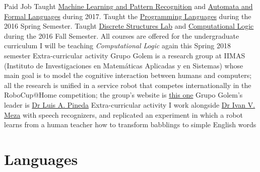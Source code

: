 \documentclass[8pt,a4paper,sans]{moderncv} %
\begin{document}
        {Paid Job}
        {Taught \href{http://turing.iimas.unam.mx/~ivanvladimir/page/curso_rpyaa}{Machine Learning and Pattern Recognition} and \href{https://sites.google.com/site/automataslengformales20172/}{Automata and Formal Languages} during 2017. Taught the \href{https://sites.google.com/site/lengprog20162/}{Programming Languages} during the 2016 Spring Semester. Taught \href{https://sites.google.com/a/ciencias.unam.mx/estructuras-discretas/home}{Discrete Structures Lab} and \href{https://sites.google.com/site/logcompunam20171/home}{Computational Logic} during the 2016 Fall Semester. All courses are offered for the undergraduate curriculum}
        {I will be teaching \emph{Computational Logic} again this Spring 2018 semester}{}{}
        {Extra-curricular activity}
        {Grupo Golem is a research group at IIMAS (Instituto de Investigaciones en Matem\'{a}ticas Aplicadas y en Sistemas) whose main goal is to model the cognitive interaction between humans and computers; all the research is unified in a service robot that competes internationally in the RoboCup@Home competition; the group's website is \href{http://golem.iimas.unam.mx/home.php?lang=en&sec=home}{this one}}
        {Grupo Golem's leader is \href{http://turing.iimas.unam.mx/~luis/}{Dr Luis A. Pineda}}{}{}
        {Extra-curricular activity}
        {I work alongside \href{http://turing.iimas.unam.mx/~ivanvladimir/}{Dr Ivan V. Meza} with speech recognizers, and replicated an experiment in which a robot learns from a human teacher how to transform babblings to simple English words}
        {}{}{}



\section{Languages}


\end{document}
